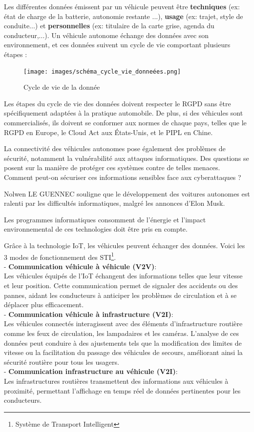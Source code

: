 \documentclass{article}
\begin{document}
Les différentes données émissent par un véhicule peuvent être \textbf{techniques} (ex: état de charge de la batterie, autonomie restante ...), \textbf{usage} (ex: trajet, style de conduite...) et \textbf{personnelles} (ex: titulaire de la carte grise, agenda du conducteur,...).
Un véhicule autonome échange des données avec son environnement, et ces données suivent un cycle de vie comportant plusieurs étapes :

\begin{figure}[h]
    \centering
    \texttt{[image: images/schéma\_cycle\_vie\_donneées.png]} 
    \caption{Cycle de vie de la donnée}
\end{figure}

Les étapes du cycle de vie des données doivent respecter le RGPD sans être spécifiquement adaptées à la pratique automobile. De plus, si des véhicules sont commercialisés, ils doivent se conformer aux normes de chaque pays, telles que le RGPD en Europe, le Cloud Act aux États-Unis, et le PIPL en Chine.

La connectivité des véhicules autonomes pose également des problèmes de sécurité, notamment la vulnérabilité aux attaques informatiques. Des questions se posent sur la manière de protéger ces systèmes contre de telles menaces. Comment peut-on sécuriser ces informations sensibles face aux cyberattaques ?

Nolwen LE GUENNEC\cite{le_gennec_machine_2023} souligne que le développement des voitures autonomes est ralenti par les difficultés informatiques, malgré les annonces d’Elon Musk. 


Les programmes informatiques consomment de l’énergie et l'impact environnemental de ces technologies doit être pris en compte.

Grâce à la technologie IoT, les véhicules peuvent échanger des données. Voici les 3 modes de fonctionnement des STI\footnote{Système de Transport Intelligent}.\\
- \textbf{Communication véhicule à véhicule (V2V)}:\\
Les véhicules équipés de l’IoT échangent des informations telles que leur vitesse et leur position. Cette communication permet de signaler des accidents ou des pannes, aidant les conducteurs à anticiper les problèmes de circulation et à se déplacer plus efficacement.\\
- \textbf{Communication véhicule à infrastructure (V2I)}:\\
Les véhicules connectés interagissent avec des éléments d’infrastructure routière comme les feux de circulation, les lampadaires et les caméras. 
L’analyse de ces données peut conduire à des ajustements tels que la modification des limites de vitesse ou la facilitation du passage des véhicules de secours, améliorant ainsi la sécurité routière pour tous les usagers.\\
- \textbf{Communication infrastructure au véhicule (V2I)}:\\
Les infrastructures routières transmettent des informations aux véhicules à proximité, permettant l’affichage en temps réel de données pertinentes pour les conducteurs.
\end{document}
